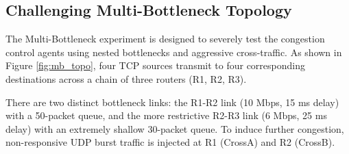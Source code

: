 \documentclass[12pt, a4paper]{article}
\begin{document}
\subsection*{Challenging Multi-Bottleneck Topology}

The Multi-Bottleneck experiment is designed to severely test the congestion control agents using nested bottlenecks and aggressive cross-traffic. As shown in Figure \ref{fig:mb_topo}, four TCP sources transmit to four corresponding destinations across a chain of three routers (R1, R2, R3). 

There are two distinct bottleneck links: the R1-R2 link (10 Mbps, 15 ms delay) with a 50-packet queue, and the more restrictive R2-R3 link (6 Mbps, 25 ms delay) with an extremely shallow 30-packet queue. To induce further congestion, non-responsive UDP burst traffic is injected at R1 (CrossA) and R2 (CrossB).
\end{document}

